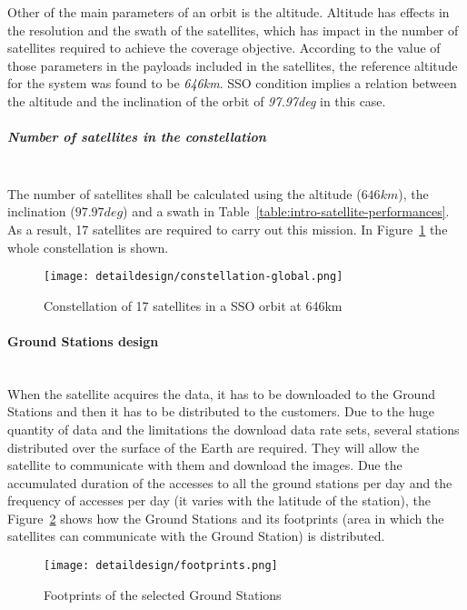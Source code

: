 Other of the main parameters of an orbit is the altitude. Altitude has effects in the resolution and the swath of the satellites, which has impact in the number of satellites required to achieve the coverage objective. According to the value of those parameters in the payloads included in the satellites, the reference altitude for the system was found to be \emph{646km}. \ac{SSO} condition implies a relation between the altitude and the inclination of the orbit of \emph{97.97deg} in this case.

\subparagraph{Number of satellites in the constellation}~\\
The number of satellites shall be calculated using the altitude ($646 km$), the
inclination ($97.97 deg$) and a swath in
Table~\ref{table:intro-satellite-performances}. As a result, 17 satellites are
required to carry out this mission. In Figure~\ref{fig:intr-constellation-global} the whole constellation is
shown.

\begin{figure}[!h]
\begin{center}
\texttt{[image: detaildesign/constellation-global.png]}
\caption{Constellation of 17 satellites in a SSO orbit at 646km}
\label{fig:intr-constellation-global}
\end{center}
\end{figure}

\paragraph{Ground Stations design}~\\
When the satellite acquires the data, it has to be downloaded to the Ground
Stations and then it has to be distributed to the customers. Due to the huge
quantity of data and the limitations the download data rate sets, several
stations distributed over the surface of the Earth are required. They will allow
the satellite to communicate with them and download the images. Due the
accumulated duration of the accesses to all the ground stations per day and the
frequency of accesses per day (it varies with the latitude of the station), the
Figure~\ref{fig:intr-footprints} shows how the Ground Stations and its
footprints (area in which the satellites can communicate with the Ground
Station) is distributed.


\begin{figure}[!h]
\begin{center}
\texttt{[image: detaildesign/footprints.png]}
\caption{Footprints of the selected Ground Stations}
\label{fig:intr-footprints}
\end{center}
\end{figure}

